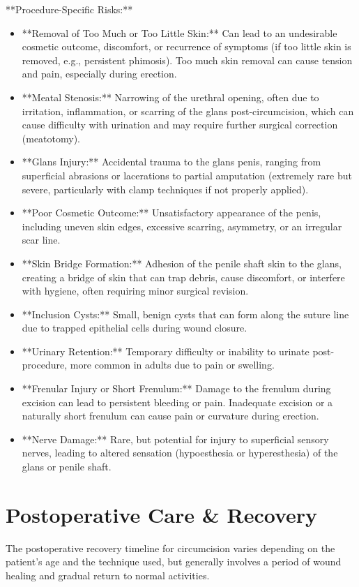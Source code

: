 **Procedure-Specific Risks:**
\begin{itemize}
  \item **Removal of Too Much or Too Little Skin:** Can lead to an undesirable cosmetic outcome, discomfort, or recurrence of symptoms (if too little skin is removed, e.g., persistent phimosis). Too much skin removal can cause tension and pain, especially during erection.
  \item **Meatal Stenosis:** Narrowing of the urethral opening, often due to irritation, inflammation, or scarring of the glans post-circumcision, which can cause difficulty with urination and may require further surgical correction (meatotomy).
  \item **Glans Injury:** Accidental trauma to the glans penis, ranging from superficial abrasions or lacerations to partial amputation (extremely rare but severe, particularly with clamp techniques if not properly applied).
  \item **Poor Cosmetic Outcome:** Unsatisfactory appearance of the penis, including uneven skin edges, excessive scarring, asymmetry, or an irregular scar line.
  \item **Skin Bridge Formation:** Adhesion of the penile shaft skin to the glans, creating a bridge of skin that can trap debris, cause discomfort, or interfere with hygiene, often requiring minor surgical revision.
  \item **Inclusion Cysts:** Small, benign cysts that can form along the suture line due to trapped epithelial cells during wound closure.
  \item **Urinary Retention:** Temporary difficulty or inability to urinate post-procedure, more common in adults due to pain or swelling.
  \item **Frenular Injury or Short Frenulum:** Damage to the frenulum during excision can lead to persistent bleeding or pain. Inadequate excision or a naturally short frenulum can cause pain or curvature during erection.
  \item **Nerve Damage:** Rare, but potential for injury to superficial sensory nerves, leading to altered sensation (hypoesthesia or hyperesthesia) of the glans or penile shaft.
\end{itemize}

\section*{Postoperative Care \& Recovery}
The postoperative recovery timeline for circumcision varies depending on the patient's age and the technique used, but generally involves a period of wound healing and gradual return to normal activities.

